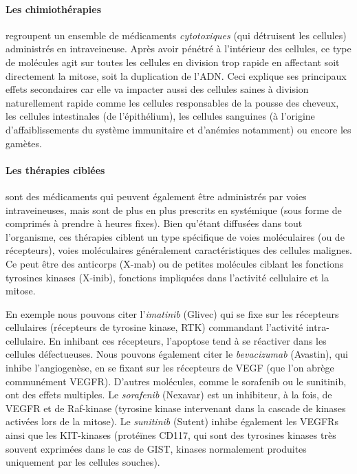 \documentclass[main.tex]{subfiles}
\begin{document}
\paragraph{Les chimiothérapies} regroupent un ensemble de médicaments \emph{cytotoxiques} (\ie qui détruisent les cellules) administrés en intraveineuse. 
Après avoir pénétré à l'intérieur des cellules, ce type de molécules agit 
sur toutes les cellules en division trop rapide en affectant soit directement la mitose, soit la duplication de l'ADN. 
Ceci explique ses principaux effets secondaires car elle va impacter aussi des cellules saines à division naturellement rapide comme les cellules responsables de la pousse des cheveux, les cellules intestinales (de l'épithélium), les cellules sanguines (à l'origine d'affaiblissements du système immunitaire et d'anémies notamment) ou encore les gamètes.

\paragraph{Les thérapies ciblées} sont des médicaments qui peuvent également être administrés par voies intraveineuses, mais sont de plus en plus prescrits en %
systémique 
(\ie sous forme de comprimés à prendre à heures fixes). Bien qu'étant diffusées dans tout l'organisme, ces thérapies ciblent un type spécifique de voies moléculaires (ou de récepteurs), voies moléculaires généralement caractéristiques des cellules malignes. Ce peut être des anticorps (X-mab) ou de petites molécules ciblant les fonctions tyrosines kinases (X-inib), fonctions impliquées dans l'activité cellulaire et la mitose. 

En exemple nous pouvons citer l'\emph{imatinib} (Glivec) qui se fixe sur les récepteurs cellulaires (récepteurs de tyrosine kinase, RTK) commandant l'activité intra-cellulaire. En inhibant ces récepteurs, l'apoptose tend à se réactiver dans les cellules défectueuses. 
Nous pouvons également citer le \emph{bevacizumab} (Avastin), qui inhibe l'angiogenèse, en se fixant sur les récepteurs de VEGF (que l'on abrège communément VEGFR). D'autres molécules, comme  le sorafenib ou le sunitinib, ont des effets multiples. 
Le \emph{sorafenib} (Nexavar) est un inhibiteur, à la fois, de VEGFR et de Raf-kinase (tyrosine kinase intervenant dans la cascade de kinases activées lors de la mitose). 
Le \emph{sunitinib} (Sutent) inhibe également les VEGFRs ainsi que les KIT-kinases (protéïnes CD117, qui sont des tyrosines kinases très souvent exprimées dans le cas de GIST, kinases normalement produites uniquement par les cellules souches).
\end{document}
